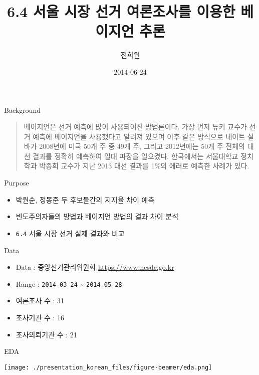 \documentclass[ignorenonframetext,]{beamer}
\title{6.4 서울 시장 선거 여론조사를 이용한 베이지언 추론}
\author{전희원}
\date{2014-06-24}
\makeatletter
\def\maxwidth{\ifdim\Gin@nat@width>\linewidth\linewidth\else\Gin@nat@width\fi}
\def\maxheight{\ifdim\Gin@nat@height>\textheight0.8\textheight\else\Gin@nat@height\fi}
\renewcommand{\includegraphics}[2][]{%
    \Oldincludegraphics[#1,width=\maxwidth,height=\maxheight,keepaspectratio]{#2}}
\makeatother
\begin{document}
\frame{\titlepage}

\begin{frame}{Background}

\begin{quote}
베이지언은 선거 예측에 많이 사용되어진 방법론이다. 가장 먼저 튜키 교수가
선거 예측에 베이지언을 사용했다고 알려져 있으며 이후 같은 방식으로
네이트 실바가 2008년에 미국 50개 주 중 49개 주, 그리고 2012년에는 50개
주 전체의 대선 결과를 정확히 예측하여 일대 파장을 일으켰다. 한국에서는
서울대학교 정치학과 박종희 교수가 지난 2013 대선 결과를 1\%의 에러로
예측한 사례가 있다.
\end{quote}

\end{frame}

\begin{frame}{Purpose}

\begin{itemize}
\itemsep1pt\parskip0pt
\item
  박원순, 정몽준 두 후보들간의 지지율 차이 예측
\item
  빈도주의자들의 방법과 베이지언 방법의 결과 차이 분석
\item
  \texttt{6.4} 서울 시장 선거 실제 결과와 비교
\end{itemize}

\end{frame}

\begin{frame}{Data}

\begin{itemize}
\itemsep1pt\parskip0pt
\item
  Data : 중앙선거관리위원회 \url{https://www.nesdc.go.kr}
\item
  Range : \texttt{2014-03-24} \textasciitilde{} \texttt{2014-05-28}
\item
  여론조사 수 : 31
\item
  조사기관 수 : 16
\item
  조사의뢰기관 수 : 21
\end{itemize}

\end{frame}

\begin{frame}{EDA}

\texttt{[image: ./presentation\_korean\_files/figure-beamer/eda.png]}

\end{frame}
\end{document}
